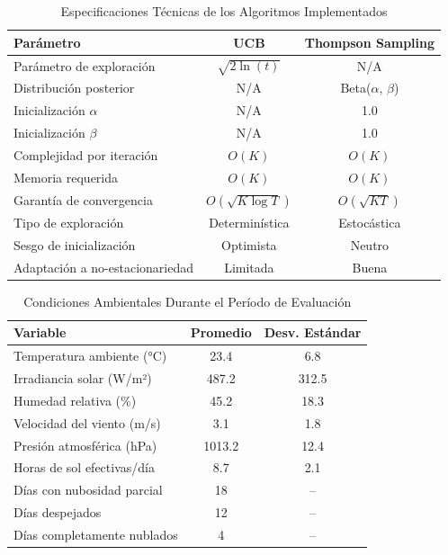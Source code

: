 \documentclass[conference]{IEEEtran}
\begin{document}
\begin{table}[H]
\centering
\caption{Especificaciones Técnicas de los Algoritmos Implementados}
\label{tab:algorithm_specs}
\begin{tabular}{lcc}
\toprule
\textbf{Parámetro} & \textbf{UCB} & \textbf{Thompson Sampling} \\
\midrule
Parámetro de exploración & $\sqrt{2\ln(t)}$ & N/A \\
Distribución posterior & N/A & Beta($\alpha$, $\beta$) \\
Inicialización $\alpha$ & N/A & 1.0 \\
Inicialización $\beta$ & N/A & 1.0 \\
Complejidad por iteración & $O(K)$ & $O(K)$ \\
Memoria requerida & $O(K)$ & $O(K)$ \\
Garantía de convergencia & $O(\sqrt{K\log T})$ & $O(\sqrt{KT})$ \\
Tipo de exploración & Determinística & Estocástica \\
Sesgo de inicialización & Optimista & Neutro \\
Adaptación a no-estacionariedad & Limitada & Buena \\
\bottomrule
\end{tabular}
\end{table}

\begin{table}[H]
\centering
\caption{Condiciones Ambientales Durante el Período de Evaluación}
\label{tab:environmental}
\begin{tabular}{lcc}
\toprule
\textbf{Variable} & \textbf{Promedio} & \textbf{Desv. Estándar} \\
\midrule
Temperatura ambiente (°C) & 23.4 & 6.8 \\
Irradiancia solar (W/m²) & 487.2 & 312.5 \\
Humedad relativa (\%) & 45.2 & 18.3 \\
Velocidad del viento (m/s) & 3.1 & 1.8 \\
Presión atmosférica (hPa) & 1013.2 & 12.4 \\
Horas de sol efectivas/día & 8.7 & 2.1 \\
Días con nubosidad parcial & 18 & -- \\
Días despejados & 12 & -- \\
Días completamente nublados & 4 & -- \\
\bottomrule
\end{tabular}
\end{table}
\end{document}
